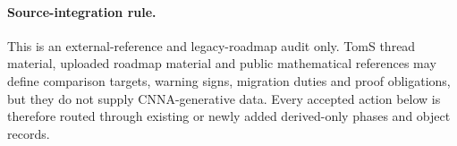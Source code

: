 \paragraph{Source-integration rule.} This is an external-reference and legacy-roadmap audit only. TomS thread material, uploaded roadmap material and public mathematical references may define comparison targets, warning signs, migration duties and proof obligations, but they do not supply CNNA-generative data. Every accepted action below is therefore routed through existing or newly added derived-only phases and object records.

